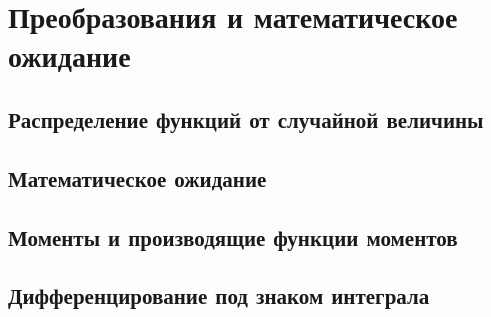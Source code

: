 \documentclass[document]{subfiles}
\begin{document}
\chapter{Преобразования и математическое ожидание}
\section{Распределение функций от случайной величины}
\section{Математическое ожидание}
\section{Моменты и производящие функции моментов}
\section{Дифференцирование под знаком интеграла}
\end{document}
